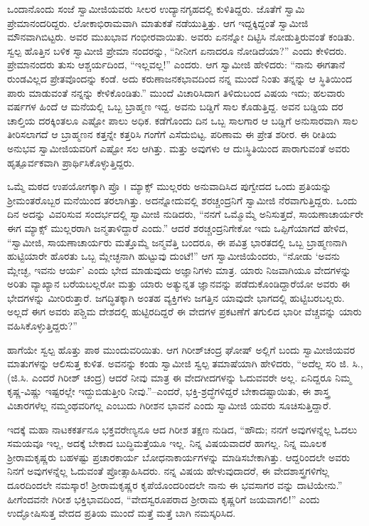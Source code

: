 ಒಂದಾನೊಂದು ಸಂಜೆ ಸ್ವಾಮೀಜಿಯವರು ಸೀಲರ ಉದ್ಯಾನಗೃಹದಲ್ಲಿ ಕುಳಿತಿದ್ದರು. ಜೊತೆಗೆ ಸ್ವಾಮಿ ಪ್ರೇಮಾನಂದರಿದ್ದರು. ಲೋಕಾಭಿರಾಮವಾಗಿ ಮಾತುಕತೆ ನಡೆಯುತ್ತಿತ್ತು. ಆಗ ಇದ್ದಕ್ಕಿದ್ದಂತೆ ಸ್ವಾಮೀಜಿ ಮೌನವಾಗಿಬಿಟ್ಟರು. ಅವರ ಮುಖಭಾವ ಗಂಭೀರವಾಯಿತು. ಅವರು ಏನನ್ನೋ ದಿಟ್ಟಿಸಿ ನೋಡುತ್ತಿರುವಂತೆ ಕಂಡಿತು. ಸ್ವಲ್ಪ ಹೊತ್ತಿನ ಬಳಿಕ ಸ್ವಾಮೀಜಿ ಪ್ರೇಮಾ ನಂದರನ್ನು, “ನೀನೀಗ ಏನಾದರೂ ನೋಡಿದೆಯಾ?” ಎಂದು ಕೇಳಿದರು. ಪ್ರೇಮಾನಂದರು ತುಸು ಆಶ್ಚರ್ಯದಿಂದ, “ಇಲ್ಲವಲ್ಲ!” ಎಂದರು. ಆಗ ಸ್ವಾಮೀಜಿ ಹೇಳಿದರು: “ನಾನು ಈಗತಾನೆ ರುಂಡವಿಲ್ಲದ ಪ್ರೇತವೊಂದನ್ನು ಕಂಡೆ. ಅದು ಕರುಣಾಜನಕಭಾವದಿಂದ ನನ್ನ ಮುಂದೆ ನಿಂತು ತನ್ನನ್ನು ಆ ಸ್ಥಿತಿಯಿಂದ ಪಾರು ಮಾಡುವಂತೆ ನನ್ನನ್ನು ಕೇಳಿಕೊಂಡಿತು.” ಮುಂದೆ ವಿಚಾರಿಸಿದಾಗ ತಿಳಿದುಬಂದ ವಿಷಯ ಇದು; ಹಲವಾರು ವರ್ಷಗಳ ಹಿಂದೆ ಆ ಮನೆಯಲ್ಲಿ ಒಬ್ಬ ಬ್ರಾಹ್ಮಣ ಇದ್ದ. ಅವನು ಬಡ್ಡಿಗೆ ಸಾಲ ಕೊಡುತ್ತಿದ್ದ. ಅವನ ಬಡ್ಡಿಯ ದರ ಚಾಲ್ತಿಯ ದರಕ್ಕಿಂತಲೂ ಎಷ್ಟೋ ಪಾಲು ಅಧಿಕ. ಕಡೆಗೊಂದು ದಿನ ಒಬ್ಬ ಸಾಲಗಾರ ಆ ಬಡ್ಡಿಗೆ ಅನುಸಾರವಾಗಿ ಸಾಲ ತೀರಿಸಲಾಗದೆ ಆ ಬ್ರಾಹ್ಮಣನ ಕತ್ತನ್ನೇ ಕತ್ತರಿಸಿ ಗಂಗೆಗೆ ಎಸೆದುಬಿಟ್ಟ. ಪರಿಣಾಮ ಈ ಪ್ರೇತ ಶರೀರ. ಈ ರೀತಿಯ ಅನುಭವ ಸ್ವಾಮೀಜಿಯವರಿಗೆ ಎಷ್ಟೋ ಸಲ ಆಗಿತ್ತು. ಮತ್ತು ಅವುಗಳು ಆ ದುಃಸ್ಥಿತಿಯಿಂದ ಪಾರಾಗುವಂತೆ ಅವರು ಹೃತ್ಪೂರ್ವಕವಾಗಿ ಪ್ರಾರ್ಥಿಸಿಕೊಳ್ಳುತ್ತಿದ್ದರು.

ಒಮ್ಮೆ ಮಠದ ಉಪಯೋಗಕ್ಕಾಗಿ ಪ್ರೊ । ಮ್ಯಾಕ್ಸ್ ಮುಲ್ಲರರು ಅನುವಾದಿಸಿದ ಪುಗ್ವೇದದ ಒಂದು ಪ್ರತಿಯನ್ನು ಶ್ರೀಮಂತರೊಬ್ಬರ ಮನೆಯಿಂದ ತರಲಾಗಿತ್ತು. ಅದನ್ನೋದುವಲ್ಲಿ ಶರಚ್ಚಂದ್ರನಿಗೆ ಸ್ವಾಮೀಜಿ ನೆರವಾಗುತ್ತಿದ್ದರು. ಒಂದು ದಿನ ಅದನ್ನು ವಿವರಿಸುವ ಸಂದರ್ಭದಲ್ಲಿ ಸ್ವಾಮೀಜಿ ನುಡಿದರು, “ನನಗೆ ಒಮ್ಮೊಮ್ಮೆ ಅನಿಸುತ್ತದೆ, ಸಾಯಣಾಚಾರ್ಯರೇ ಈಗ ಮ್ಯಾಕ್ಸ್ ಮುಲ್ಲರರಾಗಿ ಜನ್ಮತಾಳಿದ್ದಾರೆ ಎಂದು.” ಆದರೆ ಶರಚ್ಚಂದ್ರನಿಗೇಕೋ ಇದು ಒಪ್ಪಿಗೆಯಾಗದೆ ಹೇಳಿದ, “ಸ್ವಾಮೀಜಿ, ಸಾಯಣಾಚಾರ್ಯರು ಮತ್ತೊಮ್ಮೆ ಜನ್ಮವೆತ್ತಿ ಬಂದರೂ, ಈ ಪವಿತ್ರ ಭಾರತದಲ್ಲಿ ಒಬ್ಬ ಬ್ರಾಹ್ಮಣನಾಗಿ ಹುಟ್ಟಿಯಾರೇ ಹೊರತು ಒಬ್ಬ ಮ್ಲೇಚ್ಛನಾಗಿ ಹುಟ್ಟುವು ದುಂಟೆ!” ಆಗ ಸ್ವಾಮೀಜಿಯೆಂದರು, “ನೋಡು ‘ಅವನು ಮ್ಲೇಚ್ಛ, ಇವನು ಆರ್ಯ’ ಎಂದು ಭೇದ ಮಾಡುವುದು ಅಜ್ಞಾನಿಗಳು ಮಾತ್ರ. ಯಾರು ನಿಜವಾಗಿಯೂ ವೇದಗಳನ್ನು ಅರಿತು ವ್ಯಾಖ್ಯಾನ ಬರೆಯಬಲ್ಲರೋ ಮತ್ತು ಯಾರು ಅತ್ಯುನ್ನತ ಜ್ಞಾನವನ್ನು ಪಡೆದುಕೊಂಡಿದ್ದಾರೆಯೋ ಅವರು ಈ ಭೇದಗಳನ್ನು ಮೀರಿರುತ್ತಾರೆ. ಜಗದ್ಧಿತಕ್ಕಾಗಿ ಅಂತಹ ವ್ಯಕ್ತಿಗಳು ಜಗತ್ತಿನ ಯಾವುದೇ ಭಾಗದಲ್ಲಿ ಹುಟ್ಟಿಬರಬಲ್ಲರು. ಅಲ್ಲದೆ ಈಗ ಅವರು ಪಶ್ಚಿಮ ದೇಶದಲ್ಲಿ ಹುಟ್ಟಿರದಿದ್ದರೆ ಈ ವೇದಗಳ ಪ್ರಕಟಣೆಗೆ ತಗುಲಿದ ಭಾರೀ ವೆಚ್ಚವನ್ನು ಯಾರು ವಹಿಸಿಕೊಳ್ಳುತ್ತಿದ್ದರು?”

ಹಾಗೆಯೇ ಸ್ವಲ್ಪ ಹೊತ್ತು ಪಾಠ ಮುಂದುವರಿಯಿತು. ಆಗ ಗಿರೀಶ್​ಚಂದ್ರ ಘೋಷ್ ಅಲ್ಲಿಗೆ ಬಂದು ಸ್ವಾಮೀಜಿಯವರ ಮಾತುಗಳನ್ನು ಆಲಿಸುತ್ತ ಕುಳಿತ. ಅವನನ್ನು ಕಂಡು ಸ್ವಾಮೀಜಿ ಸ್ವಲ್ಪ ತಮಾಷೆಯಾಗಿ ಹೇಳಿದರು, “ಅದೆಲ್ಲ ಸರಿ ಜಿ. ಸಿ., (ಜಿ.ಸಿ. ಎಂದರೆ ಗಿರೀಶ್ ಚಂದ್ರ) ಆದರೆ ನೀವು ಮಾತ್ರ ಈ ವೇದಗೀದಗಳನ್ನು ಓದುವವರೇ ಅಲ್ಲ. ಏನಿದ್ದರೂ ನಿಮ್ಮ ಕೃಷ್ಣ-ವಿಷ್ಣು ಇಷ್ಟರಲ್ಲೇ ಇದ್ದುಬಿಡುತ್ತೀರಿ ನೀವು.”–ಎಂದರೆ, ಭಕ್ತಿ-ಶ್ರದ್ಧೆಗಳಿದ್ದರೆ ಬೇಕಾದಷ್ಟಾಯಿತು, ಈ ಶಾಸ್ತ್ರ ವಿಚಾರಗಳೆಲ್ಲ ನಮ್ಮಂಥವರಿಗಲ್ಲ ಎಂಬುದು ಗಿರೀಶನ ಭಾವನೆ ಎಂದು ಸ್ವಾಮೀಜಿ ಯವರು ಸೂಚಿಸುತ್ತಿದ್ದಾರೆ.

ಇದಕ್ಕೆ ಮಹಾ ನಾಟಕಕರ್ತನೂ ಭಕ್ತವರೇಣ್ಯನೂ ಆದ ಗಿರೀಶ ತಕ್ಷಣ ನುಡಿದ, “ಹೌದು; ನನಗೆ ಅವುಗಳನ್ನೆಲ್ಲ ಓದಲು ಸಮಯವೂ ಇಲ್ಲ, ಅದಕ್ಕೆ ಬೇಕಾದ ಬುದ್ಧಿಮತ್ತೆಯೂ ಇಲ್ಲ. ನಿನ್ನ ವಿಷಯವಾದರೆ ಹಾಗಲ್ಲ. ನಿನ್ನ ಮೂಲಕ ಶ್ರೀರಾಮಕೃಷ್ಣರು ಬಹಳಷ್ಟು ಪ್ರಚಾರಕಾರ್ಯ ಬೋಧನಾಕಾರ್ಯಗಳನ್ನು ಮಾಡಿಸಬೇಕಾಗಿತ್ತು. ಆದ್ದರಿಂದಲೇ ಅವರು ನಿನಗೆ ಅವುಗಳನ್ನೆಲ್ಲ ಓದುವಂತೆ ಪ್ರೋತ್ಸಾಹಿಸಿದರು. ನನ್ನ ವಿಷಯ ಹೇಳುವುದಾದರೆ, ಈ ವೇದಶಾಸ್ತ್ರಗಳಿಗೆಲ್ಲ ದೂರದಿಂದಲೇ ನಮಸ್ಕಾರ! ಶ್ರೀರಾಮಕೃಷ್ಣರ ಕೃಪೆಯೊಂದರಿಂದಲೇ ನಾನು ಈ ಭವಸಾಗರ ವನ್ನು ದಾಟಿಯೇನು.” ಹೀಗೆಂದವನೇ ಗಿರೀಶ ಭಕ್ತಿಭಾವದಿಂದ, “ವೇದಸ್ವರೂಪರಾದ ಶ್ರೀರಾಮ ಕೃಷ್ಣರಿಗೆ ಜಯವಾಗಲಿ!” ಎಂದು ಉದ್ಘೋಷಿಸುತ್ತ ವೇದದ ಪ್ರತಿಯ ಮುಂದೆ ಮತ್ತೆ ಮತ್ತೆ ಬಾಗಿ ನಮಸ್ಕರಿಸಿದ.

